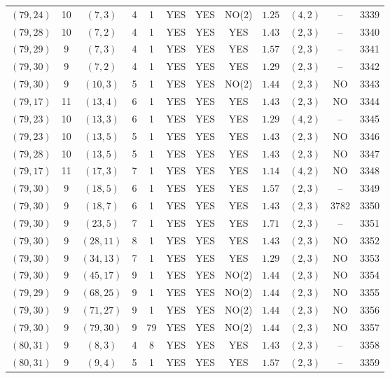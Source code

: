 \begin{longtable}{|c|c|c|c|c|c|c|c|c|c|c|c|}
$(79,24)$ & 10 & $(7,3)$ & 4 & 1 & YES & YES & NO(2) & $1.25$ & $(4,2)$ & -- & 3339\\
$(79,28)$ & 10 & $(7,2)$ & 4 & 1 & YES & YES & YES & $1.43$ & $(2,3)$ & -- & 3340\\
$(79,29)$ & 9 & $(7,3)$ & 4 & 1 & YES & YES & YES & $1.57$ & $(2,3)$ & -- & 3341\\
$(79,30)$ & 9 & $(7,2)$ & 4 & 1 & YES & YES & YES & $1.29$ & $(2,3)$ & -- & 3342\\
$(79,30)$ & 9 & $(10,3)$ & 5 & 1 & YES & YES & NO(2) & $1.44$ & $(2,3)$ & NO & 3343\\
$(79,17)$ & 11 & $(13,4)$ & 6 & 1 & YES & YES & YES & $1.43$ & $(2,3)$ & NO & 3344\\
$(79,23)$ & 10 & $(13,3)$ & 6 & 1 & YES & YES & YES & $1.29$ & $(4,2)$ & -- & 3345\\
$(79,23)$ & 10 & $(13,5)$ & 5 & 1 & YES & YES & YES & $1.43$ & $(2,3)$ & NO & 3346\\
$(79,28)$ & 10 & $(13,5)$ & 5 & 1 & YES & YES & YES & $1.43$ & $(2,3)$ & NO & 3347\\
$(79,17)$ & 11 & $(17,3)$ & 7 & 1 & YES & YES & YES & $1.14$ & $(4,2)$ & NO & 3348\\
$(79,30)$ & 9 & $(18,5)$ & 6 & 1 & YES & YES & YES & $1.57$ & $(2,3)$ & -- & 3349\\
$(79,30)$ & 9 & $(18,7)$ & 6 & 1 & YES & YES & YES & $1.43$ & $(2,3)$ & 3782 & 3350\\
$(79,30)$ & 9 & $(23,5)$ & 7 & 1 & YES & YES & YES & $1.71$ & $(2,3)$ & -- & 3351\\
$(79,30)$ & 9 & $(28,11)$ & 8 & 1 & YES & YES & YES & $1.43$ & $(2,3)$ & NO & 3352\\
$(79,30)$ & 9 & $(34,13)$ & 7 & 1 & YES & YES & YES & $1.29$ & $(2,3)$ & NO & 3353\\
$(79,30)$ & 9 & $(45,17)$ & 9 & 1 & YES & YES & NO(2) & $1.44$ & $(2,3)$ & NO & 3354\\
$(79,29)$ & 9 & $(68,25)$ & 9 & 1 & YES & YES & NO(2) & $1.44$ & $(2,3)$ & NO & 3355\\
$(79,30)$ & 9 & $(71,27)$ & 9 & 1 & YES & YES & NO(2) & $1.44$ & $(2,3)$ & NO & 3356\\
$(79,30)$ & 9 & $(79,30)$ & 9 & 79 & YES & YES & NO(2) & $1.44$ & $(2,3)$ & NO & 3357\\
$(80,31)$ & 9 & $(8,3)$ & 4 & 8 & YES & YES & YES & $1.43$ & $(2,3)$ & -- & 3358\\
$(80,31)$ & 9 & $(9,4)$ & 5 & 1 & YES & YES & YES & $1.57$ & $(2,3)$ & -- & 3359\\

\end{longtable}
